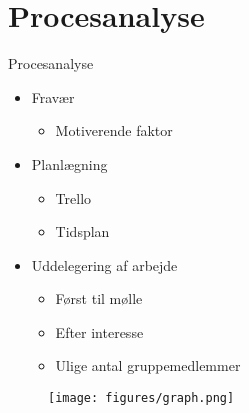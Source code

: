 
\section{Procesanalyse}
\begin{frame}{Procesanalyse}{}
	\begin{itemize}
    \item Fravær
        \begin{itemize}
            \item Motiverende faktor
        \end{itemize}
    \item Planlægning
        \begin{itemize}
            \item Trello
            \item Tidsplan
        \end{itemize}
		\item Uddelegering af arbejde
        \begin{itemize}
            \item Først til mølle
            \item Efter interesse
            \item Ulige antal gruppemedlemmer
        \end{itemize}
	\end{itemize}
  
  \begin{figure}
    \centering
    \texttt{[image: figures/graph.png]}
  \end{figure}
  
\end{frame}


